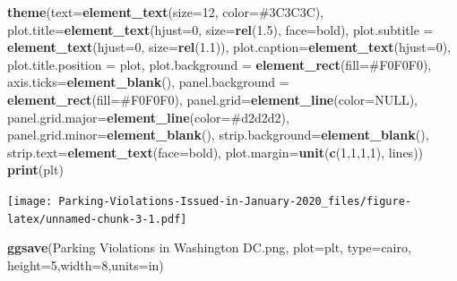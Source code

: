 \documentclass[
  paper=a4,
,captions=tableheading
]{scrartcl}
\newenvironment{Shaded}{\begin{snugshade}}{\end{snugshade}}
\newcommand{\DataTypeTok}[1]{\textcolor[rgb]{0.13,0.29,0.53}{#1}}
\newcommand{\DecValTok}[1]{\textcolor[rgb]{0.00,0.00,0.81}{#1}}
\newcommand{\FloatTok}[1]{\textcolor[rgb]{0.00,0.00,0.81}{#1}}
\newcommand{\KeywordTok}[1]{\textcolor[rgb]{0.13,0.29,0.53}{\textbf{#1}}}
\newcommand{\NormalTok}[1]{#1}
\newcommand{\OtherTok}[1]{\textcolor[rgb]{0.56,0.35,0.01}{#1}}
\newcommand{\StringTok}[1]{\textcolor[rgb]{0.31,0.60,0.02}{#1}}
\begin{document}
\begin{Shaded}
\begin{Highlighting}[]
\StringTok{  }\KeywordTok{theme}\NormalTok{(}\DataTypeTok{text=}\KeywordTok{element\_text}\NormalTok{(}\DataTypeTok{size=}\DecValTok{12}\NormalTok{, }\DataTypeTok{color=}\StringTok{\textquotesingle{}\#3C3C3C\textquotesingle{}}\NormalTok{),}
        \DataTypeTok{plot.title=}\KeywordTok{element\_text}\NormalTok{(}\DataTypeTok{hjust=}\DecValTok{0}\NormalTok{, }\DataTypeTok{size=}\KeywordTok{rel}\NormalTok{(}\FloatTok{1.5}\NormalTok{), }\DataTypeTok{face=}\StringTok{\textquotesingle{}bold\textquotesingle{}}\NormalTok{),}
        \DataTypeTok{plot.subtitle =} \KeywordTok{element\_text}\NormalTok{(}\DataTypeTok{hjust=}\DecValTok{0}\NormalTok{, }\DataTypeTok{size=}\KeywordTok{rel}\NormalTok{(}\FloatTok{1.1}\NormalTok{)),}
        \DataTypeTok{plot.caption=}\KeywordTok{element\_text}\NormalTok{(}\DataTypeTok{hjust=}\DecValTok{0}\NormalTok{),}
        \DataTypeTok{plot.title.position =} \StringTok{\textquotesingle{}plot\textquotesingle{}}\NormalTok{,}
        \DataTypeTok{plot.background =} \KeywordTok{element\_rect}\NormalTok{(}\DataTypeTok{fill=}\StringTok{\textquotesingle{}\#F0F0F0\textquotesingle{}}\NormalTok{), }\DataTypeTok{axis.ticks=}\KeywordTok{element\_blank}\NormalTok{(),}
        \DataTypeTok{panel.background =} \KeywordTok{element\_rect}\NormalTok{(}\DataTypeTok{fill=}\StringTok{\textquotesingle{}\#F0F0F0\textquotesingle{}}\NormalTok{), }\DataTypeTok{panel.grid=}\KeywordTok{element\_line}\NormalTok{(}\DataTypeTok{color=}\OtherTok{NULL}\NormalTok{),}
        \DataTypeTok{panel.grid.major=}\KeywordTok{element\_line}\NormalTok{(}\DataTypeTok{color=}\StringTok{\textquotesingle{}\#d2d2d2\textquotesingle{}}\NormalTok{), }\DataTypeTok{panel.grid.minor=}\KeywordTok{element\_blank}\NormalTok{(),}
        \DataTypeTok{strip.background=}\KeywordTok{element\_blank}\NormalTok{(), }\DataTypeTok{strip.text=}\KeywordTok{element\_text}\NormalTok{(}\DataTypeTok{face=}\StringTok{\textquotesingle{}bold\textquotesingle{}}\NormalTok{),}
        \DataTypeTok{plot.margin=}\KeywordTok{unit}\NormalTok{(}\KeywordTok{c}\NormalTok{(}\DecValTok{1}\NormalTok{,}\DecValTok{1}\NormalTok{,}\DecValTok{1}\NormalTok{,}\DecValTok{1}\NormalTok{), }\StringTok{\textquotesingle{}lines\textquotesingle{}}\NormalTok{))}
\KeywordTok{print}\NormalTok{(plt)}
\end{Highlighting}
\end{Shaded}

\texttt{[image: Parking-Violations-Issued-in-January-2020\_files/figure-latex/unnamed-chunk-3-1.pdf]}

\begin{Shaded}
\begin{Highlighting}[]
\KeywordTok{ggsave}\NormalTok{(}\StringTok{\textquotesingle{}Parking Violations in Washington DC.png\textquotesingle{}}\NormalTok{, }\DataTypeTok{plot=}\NormalTok{plt, }\DataTypeTok{type=}\StringTok{\textquotesingle{}cairo\textquotesingle{}}\NormalTok{,}
       \DataTypeTok{height=}\DecValTok{5}\NormalTok{,}\DataTypeTok{width=}\DecValTok{8}\NormalTok{,}\DataTypeTok{units=}\StringTok{\textquotesingle{}in\textquotesingle{}}\NormalTok{)}
\end{Highlighting}
\end{Shaded}
\end{document}
